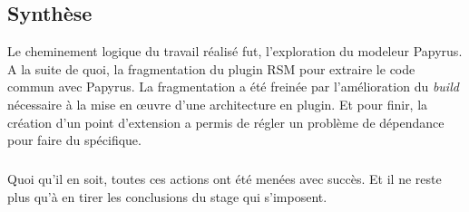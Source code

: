 \newcommand{\build}{\textit{build} }
\newcommand{\plugin}{``Plugin'' }
\newcommand{\plugins}{``Plugins'' }
\newcommand{\rsm}{``RSM'' }
\newcommand{\together}{``Together'' }

\begin{mainmatter}

	
	
	
	
	
	
	
	
	
	
	\section{Synthèse}
	
	Le cheminement logique du travail réalisé fut, l'exploration du modeleur Papyrus.
	A la suite de quoi, la fragmentation du plugin RSM pour extraire le code commun avec Papyrus.
	La fragmentation a été freinée par l'amélioration du \build nécessaire à la mise en \oe uvre d'une architecture en plugin.
	Et pour finir, la création d'un point d'extension a permis de régler un problème de dépendance pour faire du spécifique.
	
	\subparagraph*{}
	Quoi qu'il en soit, toutes ces actions ont été menées avec succès.
	Et il ne reste plus qu'à en tirer les conclusions du stage qui s'imposent.
	
	
	
	

\end{mainmatter}
